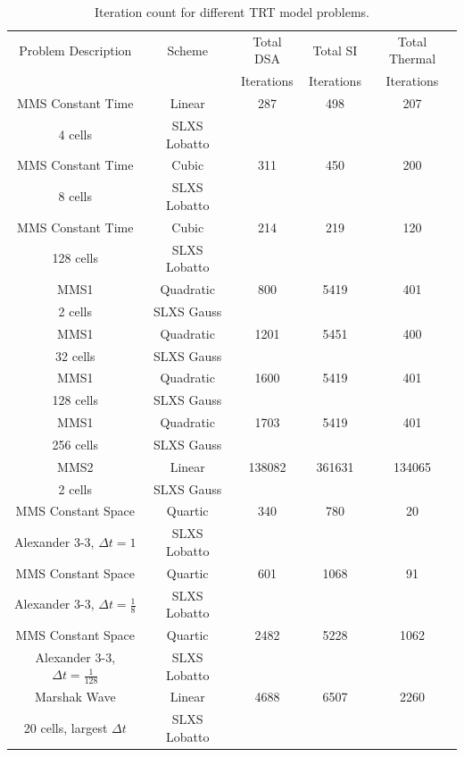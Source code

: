 \begin{table}[!htp]
\centering
\caption{Iteration count for different TRT model problems.}
\begin{tabular}{|c|c|c|c|c|}
\hline
Problem Description & Scheme & Total DSA & Total SI & Total Thermal \\
{}									&				 &  Iterations & Iterations & Iterations \\
\hline
MMS Constant Time & Linear  & 287 & 498 & 207 \\
4 cells 					& SLXS Lobatto & {} & {} & {} \\
\hline
MMS Constant Time	 & Cubic 			 & 311 &  450 & 200 \\
8 cells 						& SLXS Lobatto & {} & {} & {} \\
\hline
MMS Constant Time	 & Cubic 				 & 214 & 219 & 120 \\
128 cells 					& SLXS Lobatto & {} & {} & {} \\
\hline
MMS1 						& Quadratic 		& 800 & 5419 & 401 \\
2 cells 				& SLXS Gauss 		& {} & {} & {} \\
\hline
MMS1 						& Quadratic 	& 1201 & 5451 & 400 \\
32 cells 				& SLXS Gauss 	& {} & {} & {} \\
\hline
MMS1	 				& Quadratic  & 1600 & 5419 & 401 \\
128 cells 		& SLXS Gauss & {} & {} & {} \\
\hline
MMS1 					& Quadratic		& 1703 & 5419 & 401 \\
256 cells 		& SLXS Gauss 	& {} & {} & {} \\
\hline
MMS2 						& Linear	 & 138082 & 361631 & 134065 \\
2 cells 					& SLXS Gauss & {} & {} & {} \\
\hline
MMS Constant Space 									& Quartic 				 & 340 & 780 & 20 \\
Alexander 3-3, $\Delta t=1$					& SLXS Lobatto 			& {} & {} & {} \\
\hline
MMS Constant Space 										& Quartic 				 & 601 & 1068 & 91\\
Alexander 3-3, $\Delta t=\frac{1}{8}$	& SLXS Lobatto 			& {} & {} & {} \\
\hline
MMS Constant Space 										& Quartic 				 & 2482 & 5228 & 1062\\
Alexander 3-3, $\Delta t=\frac{1}{128}$	& SLXS Lobatto 			& {} & {} & {} \\
\hline
Marshak Wave 									&  Linear			 & 4688 & 6507 & 2260 \\
20 cells, largest $\Delta t$	& SLXS Lobatto & {} 	& {}	 & {} \\
\hline
\end{tabular}
\label{tbl:iteration_count}
\end{table}



